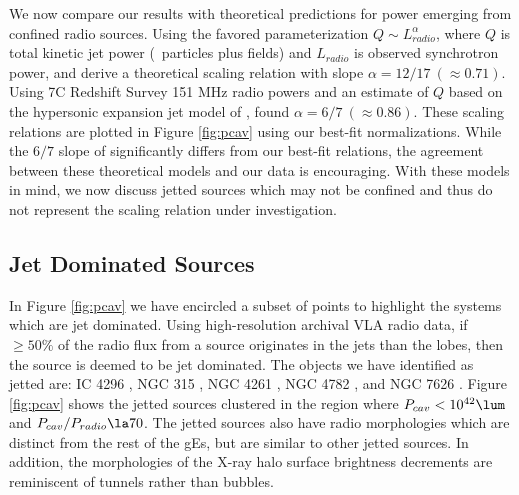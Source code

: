 \documentclass{emulateapj}
\begin{document}
We now compare our results with theoretical predictions for power
emerging from confined radio sources. Using the favored
parameterization $Q \sim L_{radio}^{\alpha}$, where $Q$ is total
kinetic jet power (\eg\ particles plus fields) and $L_{radio}$ is
observed synchrotron power, \citet{1979ApJ...232...34B} and
\citet{1995A&A...293..665F} derive a theoretical scaling relation with
slope $\alpha = 12/17~(\approx 0.71)$. Using 7C Redshift Survey 151
MHz radio powers and an estimate of $Q$ based on the hypersonic
expansion jet model of \citet{1991MNRAS.250..581F},
\citet{1999MNRAS.309.1017W} found $\alpha = 6/7~(\approx 0.86)$. These
scaling relations are plotted in Figure \ref{fig:pcav} using our
best-fit normalizations. While the $6/7$ slope of
\citet{1999MNRAS.309.1017W} significantly differs from our best-fit
relations, the agreement between these theoretical models and our data
is encouraging. With these models in mind, we now discuss jetted
sources which may not be confined and thus do not represent the
scaling relation under investigation.

\subsection{Jet Dominated Sources}
\label{sec:jet}

In Figure \ref{fig:pcav} we have encircled a subset of points to
highlight the systems which are jet dominated. Using high-resolution
archival VLA radio data, if $\ge 50\%$ of the radio flux from a source
originates in the jets than the lobes, then the source is deemed to be
jet dominated. The objects we have identified as jetted are: IC 4296
\citep{2003ApJ...585..677P}, NGC 315 \citep{1979ApJ...228L...9B,
  1981A&A....95..250W}, NGC 4261 \citep{1997ApJ...484..186J,
  2000ApJ...534..165J}, NGC 4782 \citep{2007ApJ...664..804M}, and NGC
7626 \citep{1985ApJ...291...32B}. Figure \ref{fig:pcav} shows the
jetted sources clustered in the region where $\pcav < 10^{42} \lum$
and $\pcav/\prad \la 70$. The jetted sources also have radio
morphologies which are distinct from the rest of the gEs, but are
similar to other jetted sources. In addition, the morphologies of the
X-ray halo surface brightness decrements are reminiscent of tunnels
rather than bubbles.
\end{document}
